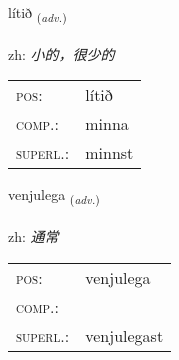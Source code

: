 \documentclass[frontgrid, backgrid]{flacards}\usepackage[]{graphicx}\usepackage[]{color}
\begin{document}
\renewcommand{\flhead}{\vskip5pt \fboxsep=0pt {\small\bfseries\footnotesize Atviksorð | 副词}}
\renewcommand{\fcfoot}{\vskip5pt \fboxsep=0pt \hspace{2pt}{\small\bfseries\footnotesize 2K}}

\renewcommand{\blhead}{\vskip5pt {\small\bfseries\footnotesize Atviksorð | 副词 }}
\renewcommand{\bcfoot}{\vskip5pt \hspace{2pt}{\small\bfseries\footnotesize 2K}}


{lítið \small{\textsubscript{(\textit{adv.})}} \\[1ex] %
\textphonetic{[liːtɪð]} \\
zh: \emph{小的，很少的} \\  [2ex]
\renewcommand*{\arraystretch}{0.8}
\begin{tabular}{ll}
\textsc{pos}: & lítið \\ 
\textsc{comp.}: & minna \\ 
\textsc{superl.}: & minnst \\
\end{tabular}
}

\renewcommand{\flhead}{\vskip5pt \fboxsep=0pt {\small\bfseries\footnotesize Atviksorð | 副词}}
\renewcommand{\fcfoot}{\vskip5pt \fboxsep=0pt \hspace{2pt}{\small\bfseries\footnotesize 2K}}

\renewcommand{\blhead}{\vskip5pt {\small\bfseries\footnotesize Atviksorð | 副词 }}
\renewcommand{\bcfoot}{\vskip5pt \hspace{2pt}{\small\bfseries\footnotesize 2K}}


{venjulega \small{\textsubscript{(\textit{adv.})}} \\[1ex] %
\textphonetic{[vɛnjʏlɛɣa]} \\
zh: \emph{通常} \\  [2ex]
\renewcommand*{\arraystretch}{0.8}
\begin{tabular}{ll}
\textsc{pos}: & venjulega \\ 
\textsc{comp.}: &  \\ 
\textsc{superl.}: & venjulegast \\
\end{tabular}
}
\end{document}
